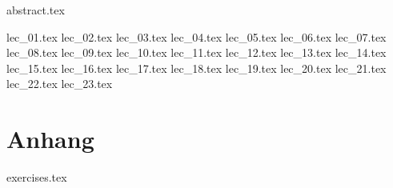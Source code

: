 \documentclass[fancyfoot, a4paper, german, git]{mkessler-script}
\author{Maximilian Keßler}
\begin{document}
    \maketitle

    {abstract.tex}

    \cleardoublepage
    \tableofcontents

    \cleardoublepage
    \summaryoflectures

    \cleardoublepage
    {lec_01.tex}
    {lec_02.tex}
    {lec_03.tex}
    {lec_04.tex}
    {lec_05.tex}
    {lec_06.tex}
    {lec_07.tex}
    {lec_08.tex}
    {lec_09.tex}
    {lec_10.tex}
    {lec_11.tex}
    {lec_12.tex}
    {lec_13.tex}
    {lec_14.tex}
    {lec_15.tex}
    {lec_16.tex}
    {lec_17.tex}
    {lec_18.tex}
    {lec_19.tex}
    {lec_20.tex}
    {lec_21.tex}
    {lec_22.tex}
    {lec_23.tex}

    \cleardoublepage
    \appendix
    \part{Anhang}

    {exercises.tex}
    
    \cleardoublepage

    \cleardoublepage
    \printvocabindex

    \cleardoublepage
    \printimageattributions

    \cleardoublepage
    \printliterature
\end{document}
